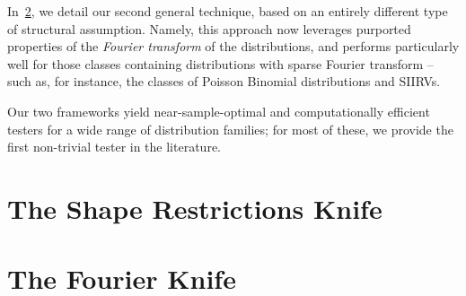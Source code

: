 In~\cref{sec:fourier}, we detail our second general technique, based on an entirely different type of structural assumption. Namely, this approach now leverages purported properties of the \emph{Fourier transform} of the distributions, and performs particularly well for those classes containing distributions with sparse Fourier transform -- such as, for instance, the classes of Poisson Binomial distributions and SIIRVs.

Our two frameworks yield near-sample-optimal and computationally efficient testers for a wide range of distribution families; for most of these, we provide the first non-trivial tester in the literature.


\section{The Shape Restrictions Knife}\label{sec:shaperestrictions}


\section{The Fourier Knife}\label{sec:fourier}

